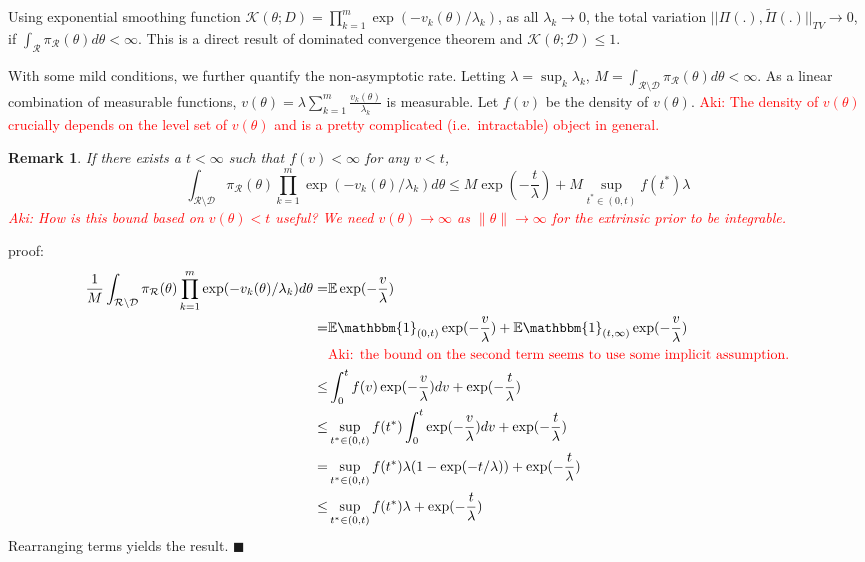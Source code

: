 \documentclass[10pt]{article}
\newcommand{\aki}[1]{\textcolor{red}{Aki: #1}}
\newtheorem{remark}{Remark}
\newcommand{\mc}[1]{\mathcal{#1}}
\DeclareMathOperator{\1}{\mathbbm{1}}
\begin{document}
Using exponential smoothing function $\mc K(\theta; D) = \prod_{k=1}^m \exp( -v_k(\theta)/\lambda_k)$, as all $\lambda_k \rightarrow 0$, the total variation $||\Pi(.), \tilde{\Pi}(.) ||_{TV} \rightarrow 0$, if $\int_{\mc R} \pi_{\mc R}(\theta) d\theta<\infty$. This is a direct result of dominated convergence theorem and $\mc K(\theta; \mc D)\le 1$.


With some mild conditions, we further quantify the non-asymptotic rate. Letting $\lambda = \sup_k \lambda_k$, $M= \int_{\mc R \setminus \mc D} \pi_{\mc R}(\theta) d\theta<\infty$. As a linear combination of measurable functions, $v(\theta)=\lambda\sum_{k=1}^m\frac{ v_k(\theta)}{\lambda_k}$ is measurable. Let $f(v)$ be the density of $v(\theta)$. \aki{The density of $v(\theta)$ crucially depends on the level set of $v(\theta)$ and is a pretty complicated (i.e.\ intractable) object in general.}

\begin{remark}
\label{convergence_rate}
If there exists a $t<\infty$ such that $f(v) < \infty$ for any $v<t$,
$$\int_{\mc R \setminus \mc D} {\pi_{\mc R}(\theta)} \prod_{k=1}^m \exp( -v_k(\theta)/\lambda_k) d \theta \le 
 {M} \exp(-\frac{t}{\lambda}) + {M} \sup_{t^*\in(0,t)} {f(t^*)}\lambda 
$$
\aki{How is this bound based on $v(\theta) < t$ useful? We need $v(\theta) \to \infty$ as $\| \theta \| \to \infty$ for the extrinsic prior to be integrable. }
\end{remark}
proof:
\begin{equation}
\begin{aligned}
\frac{1}{M}\int_{\mc R \setminus \mc D} {\pi_{\mc R}(\theta)} \prod_{k=1}^m \exp( -v_k(\theta)/\lambda_k) d \theta = & 
\mathbb{E} \exp(- \frac{v}{\lambda}) \\
= & \mathbb{E} \mathbbm{1}_{(0,t)} \exp(- \frac{v}{\lambda}) +  \mathbb{E} \mathbbm{1}_{(t,\infty)} \exp(- \frac{v}{\lambda}) \\
& \text{\aki{the bound on the second term seems to use some implicit assumption.}} \\
\le & \int_0^t f(v) \exp(- \frac{v}{\lambda}) dv + \exp(-\frac{t}{\lambda}) \\
\le & \sup_{t^*\in(0,t)} f(t^*) \int_0^t \exp(- \frac{v}{\lambda}) dv + \exp(-\frac{t}{\lambda}) \\
= & \sup_{t^*\in(0,t)} f(t^*)  \lambda (1- \exp(-t/\lambda)) + \exp(-\frac{t}{\lambda}) \\
\le  & \sup_{t^*\in(0,t)} f(t^*)  \lambda  + \exp(-\frac{t}{\lambda}) \\
\end{aligned}
\end{equation}
Rearranging terms yields the result.  $\blacksquare$
\end{document}

